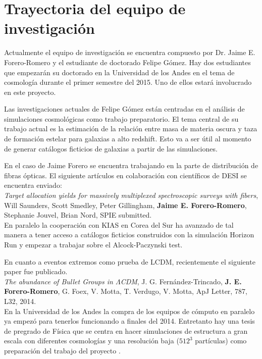 
\section{Trayectoria del equipo de investigaci\'on}

Actualmente el equipo de investigaci\'on se encuentra compuesto por Dr. Jaime E. Forero-Romero y el estudiante de doctorado Felipe G\'omez. Hay dos estudiantes que empezar\'an su doctorado en la Universidad de los Andes en el tema de cosmolog\'ia durante el primer semestre del 2015. Uno de ellos estar\'a involucrado en este proyecto.

Las investigaciones actuales de Felipe G\'omez est\'an centradas en el an\'alisis de simulaciones cosmol\'ogicas como trabajo preparatorio. El tema central de su trabajo actual es la estimaci\'on de la relaci\'on entre masa de materia oscura y taza de formaci\'on estelar para galaxias a alto redshift. Esto va a ser \'util al momento de generar cat\'alogos ficticios de galaxias a partir de las simulaciones. 

En el caso de Jaime Forero se encuentra trabajando en la parte de distribuci\'on de fibras \'opticas. El siguiente art\'iculos en colaboraci\'on con cient\'ificos de DESI se encuentra enviado:\\

{\it Target allocation yields for massively multiplexed spectroscopic surveys with fibers}, Will Saunders, Scott Smedley, Peter Gillingham, {\bf Jaime E. Forero-Romero}, Stephanie Jouvel, Brian Nord, SPIE submitted.\\

En paralelo la cooperaci\'on con KIAS en Corea del Sur ha avanzado de tal manera a tener acceso a cat\'alogos ficticios construidos con la simulaci\'on Horizon Run y empezar a trabajar sobre el Alcock-Paczynski test.

En cuanto a eventos extremos como prueba de LCDM, recientemente el siguiente paper fue publicado.\\

{\it The abundance of Bullet Groups in $\Lambda$CDM},
  J. G. Fern\'andez-Trincado, {\bf J. E. Forero-Romero}, G. Foex,
  V. Motta, T. Verdugo, V. Motta, ApJ Letter, 787, L32, 2014.\\

En la Universidad de los Andes la compra de los equipos de c\'omputo en paralelo ya empez\'o para tenerlos funcionando a finales del 2014. Entretanto hay una tesis de pregrado de F\'isica que se centra en hacer simulaciones de estructura a gran escala con diferentes cosmolog\'ias y una resoluci\'on baja ($512^3$ part\'iculas) como preparaci\'on del trabajo del proyecto \coco.


